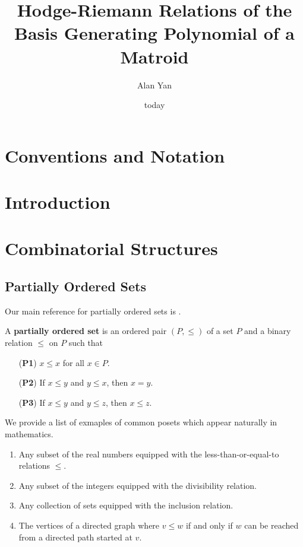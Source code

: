 \documentclass{puthesis-UG}
\author{Alan Yan}
\title{Hodge-Riemann Relations of the Basis Generating Polynomial of a Matroid}
\date{today}
\begin{document}
 
\chapter{Conventions and Notation}

\chapter{Introduction}

\chapter{Combinatorial Structures}

\section{Partially Ordered Sets}

Our main reference for partially ordered sets is \cite{ordered-sets}. 
\begin{defn}
	A \textbf{partially ordered set} is an ordered pair $(P, \leq)$ of a set $P$ and a binary relation $\leq$ on $P$ such that 
	\begin{enumerate}
		\item[(\textbf{P1})] $x \leq x$ for all $x \in P$. 
		\item[(\textbf{P2})] If $x \leq y$ and $y \leq x$, then $x = y$. 
		\item[(\textbf{P3})] If $x \leq y$ and $y \leq z$, then $x \leq z$. 
	\end{enumerate}
\end{defn}

\begin{example}
	We provide a list of exmaples of common posets which appear naturally in mathematics. 
	\begin{enumerate}[label = (\alph*)]
		\item Any subset of the real numbers equipped with the less-than-or-equal-to relations $\leq$.
		\item Any subset of the integers equipped with the divisibility relation.
		\item Any collection of sets equipped with the inclusion relation. 
		\item The vertices of a directed graph where $v \leq w$ if and only if $w$ can be reached from a directed path started at $v$. 
	\end{enumerate}
\end{example}
\end{document}
